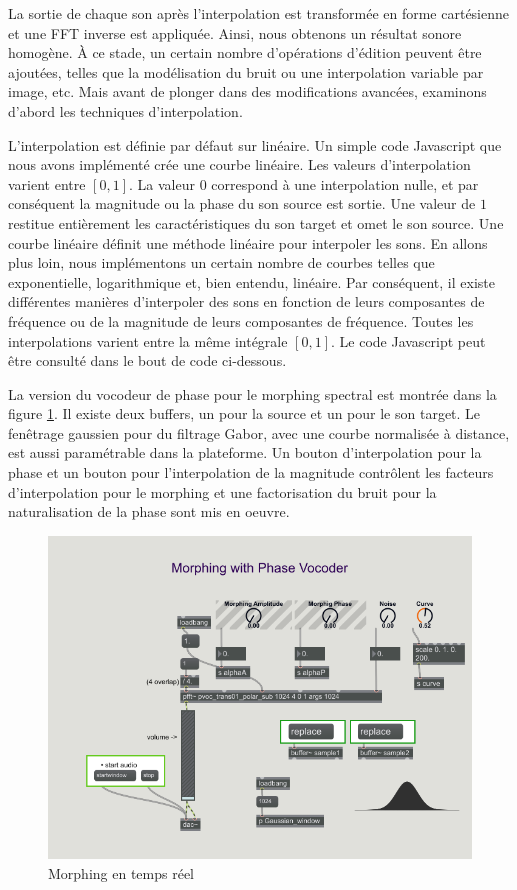 La sortie de chaque son après l’interpolation est transformée en forme cartésienne et une FFT inverse est appliquée. Ainsi, nous obtenons un résultat sonore homogène. À ce stade, un certain nombre d'opérations d'édition peuvent être ajoutées, telles que la modélisation du bruit ou une interpolation variable par image, etc. Mais avant de plonger dans des modifications avancées, examinons d'abord les techniques d'interpolation.

L'interpolation est définie par défaut sur linéaire. Un simple code Javascript que nous avons implémenté crée une courbe linéaire. Les valeurs d'interpolation varient entre $ [0, 1] $. La valeur $ 0 $ correspond à une interpolation nulle, et par conséquent la magnitude ou la phase du son source est sortie. Une valeur de $ 1 $ restitue entièrement les caractéristiques du son target et omet le son source. Une courbe linéaire définit une méthode linéaire pour interpoler les sons. En allons plus loin, nous implémentons un certain nombre de courbes telles que exponentielle, logarithmique et, bien entendu, linéaire. Par conséquent, il existe différentes manières d'interpoler des sons en fonction de leurs composantes de fréquence ou de la magnitude de leurs composantes de fréquence. Toutes les interpolations varient entre la même intégrale $ [0, 1] $. Le code Javascript peut être consulté dans le bout de code ci-dessous.

La version du vocodeur de phase pour le morphing spectral est montrée dans la figure \ref{Morphing}. Il existe deux buffers, un pour la source et un pour le son target. Le fenêtrage gaussien pour du filtrage Gabor, avec une courbe normalisée à distance, est aussi paramétrable dans la plateforme. Un bouton d’interpolation pour la phase et un bouton pour l’interpolation de la magnitude contrôlent les facteurs d’interpolation pour le morphing et une factorisation du bruit pour la naturalisation de la phase sont mis en oeuvre.

    \begin{figure}
        \centering
        \includegraphics[width = \textwidth]{Graphs/SoundMorphing.png}
        \caption{Morphing en temps réel}
        \label{Morphing}
    \end{figure}


\noindent\begin{minipage}{\textwidth}

\end{minipage}
